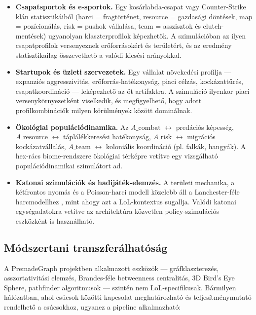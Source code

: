 ﻿\documentclass[a4paper,12pt]{report}
\begin{document}
\begin{itemize}
  \item \textbf{Csapatsportok és e-sportok.} Egy kosárlabda-csapat vagy Counter-Strike
    klán statisztikáiból (harci = fragtörténet, resource = gazdasági döntések, map = pozícionálás,
    risk = pushok vállalása, team = asszisztok és clutch-mentések) ugyanolyan klaszterprofilok
    képezhetők. A szimulációban az ilyen csapatprofilok versenyeznek erőforrásokért és
    területért, és az eredmény statisztikailag összevethető a valódi kiesési arányokkal.
  \item \textbf{Startupok és üzleti szervezetek.} Egy vállalat növekedési profilja ---
    expanziós aggresszivitás, erőforrás-hatékonyság, piaci célzás, kockázattűrés,
    csapatkoordináció --- leképezhető az öt artifaktra. A szimuláció ilyenkor piaci
    versenykörnyezetként viselkedik, és megfigyelhető, hogy adott profilkombinációk
    milyen körülmények között dominálnak.
  \item \textbf{Ökológiai populációdinamika.} Az $A\_\text{combat}$ $\leftrightarrow$ predációs képesség,
    $A\_\text{resource}$ $\leftrightarrow$ táplálékkeresési hatékonyság, $A\_\text{risk}$ $\leftrightarrow$ migrációs kockázatvállalás,
    $A\_\text{team}$ $\leftrightarrow$ koloniális koordináció (pl. falkák, hangyák). A hex-rács biome-rendszere
    ökológiai térképre vetítve egy vizsgálható populációdinamikai szimulátort ad.
  \item \textbf{Katonai szimulációk és hadijáték-elemzés.} A területi mechanika,
    a kétfrontos nyomás és a Poisson-harci modell közelebb áll a Lanchester-féle
    harcmodellhez \cite{lanchester1916}, mint ahogy azt a LoL-kontextus sugallja.
    Valódi katonai egységadatokra vetítve az architektúra közvetlen policy-szimulációs
    eszközként is használható.
\end{itemize}

\subsection*{Módszertani transzferálhatóság}

A PremadeGraph projektben alkalmazott eszközök --- gráfklaszterezés, asszortativitási
elemzés, Brandes-féle betweenness centralitás, 3D Bird's Eye Sphere, pathfinder
algoritmusok --- szintén nem LoL-specifikusak. Bármilyen hálózatban, ahol csúcsok
közötti kapcsolat meghatározható és teljesítménymutató rendelhető a csúcsokhoz,
ugyanez a pipeline alkalmazható:
\end{document}

